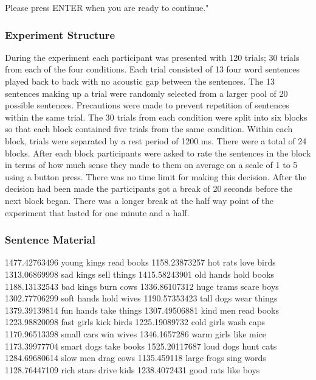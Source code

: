 \documentclass[a4paper,10pt,twoside]{article}
\begin{document}
Please press ENTER when you are ready to continue."

\subsubsection{Experiment Structure}

During the experiment each participant was presented with 120 trials; 30 trials from each of the four conditions. Each trial consisted of 13 four word sentences played back to back with no acoustic gap between the sentences. The 13 sentences making up a trial were randomly selected from a larger pool of 20 possible sentences. Precautions were made to prevent repetition of sentences within the same trial. The 30 trials from each condition were split into six blocks so that each block contained five trials from the same condition. Within each block, trials were separated by a rest period of 1200 ms. There were a total of 24 blocks. After each block participants were asked to rate the sentences in the block in terms of how much sense they made to them on average on a scale of 1 to 5 using a button press. There was no time limit for making this decision. After the decision had been made the participants got a break of 20 seconds before the next block began. There was a longer break at the half way point of the experiment that lasted for one minute and a half. 

\subsubsection{Sentence Material}


1477.42763496	young kings read books
1158.23873257	hot rats love birds 
1313.06869998	sad kings sell things
1415.58243901	old hands hold books
1188.13132543	bad kings burn cows 
1336.86107312	huge trams scare boys
1302.77706299	soft hands hold wives 
1190.57353423	tall dogs wear things
1379.39139814	fun hands take things 
1307.49506881	kind men read books
1223.98820098	fast girls kick birds 
1225.19089732	cold girls wash caps
1170.96513398	small cars win wives 
1346.1657286	warm girls like mice
1173.39977704	smart dogs take books 
1525.20117687	loud dogs hunt cats 
1284.69680614	slow men drag cows 
1135.459118	large frogs sing words
1128.76447109	rich stars drive kids
1238.4072431	good rats like boys

\end{document}

